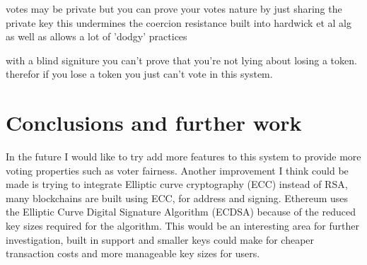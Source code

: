 \documentclass{entcs}
\begin{document}
votes may be private but you can prove your votes nature by just sharing the private key this undermines the coercion resistance built into hardwick et al alg as well as allows a lot of 'dodgy' practices

with a blind signiture you can't prove that you're not lying about losing a token. therefor if you lose a token you just can't vote in this system.


\section{Conclusions and further work}

In the future I would like to try add more features to this system to provide more voting properties such as voter fairness. Another improvement I think could be made is trying to integrate Elliptic curve cryptography (ECC) instead of RSA, many blockchains are built using ECC, for address and signing. Ethereum uses the Elliptic Curve Digital Signature Algorithm (ECDSA) because of the reduced key sizes required for the algorithm. This would be an interesting area for further investigation, built in support and smaller keys could make for cheaper transaction costs and more manageable key sizes for users.
\printbibliography
\end{document}
